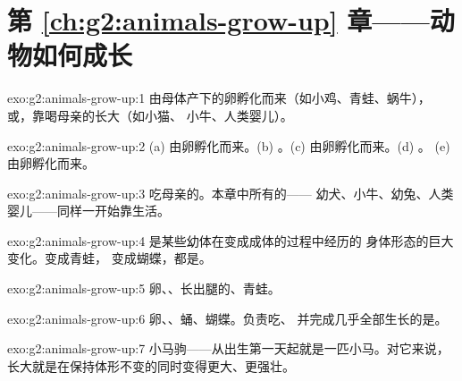 \section*{第 \ref{ch:g2:animals-grow-up} 章——动物如何成长}

\begin{solution}{exo:g2:animals-grow-up:1}
由母体产下的卵孵化而来（如小鸡、青蛙、蜗牛），
或，靠喝母亲的长大（如小猫、
小牛、人类婴儿）。
\end{solution}

\begin{solution}{exo:g2:animals-grow-up:2}
(a) 由卵孵化而来。(b) 。(c) 由卵孵化而来。(d) 。
(e) 由卵孵化而来。
\end{solution}

\begin{solution}{exo:g2:animals-grow-up:3}
吃母亲的。本章中所有的——
幼犬、小牛、幼兔、人类婴儿——同样一开始靠生活。
\end{solution}

\begin{solution}{exo:g2:animals-grow-up:4}
是某些幼体在变成成体的过程中经历的
身体形态的巨大变化。变成青蛙，
变成蝴蝶，都是。
\end{solution}

\begin{solution}{exo:g2:animals-grow-up:5}
卵、、长出腿的、青蛙。
\end{solution}

\begin{solution}{exo:g2:animals-grow-up:6}
卵、、蛹、蝴蝶。负责吃、
并完成几乎全部生长的是。
\end{solution}

\begin{solution}{exo:g2:animals-grow-up:7}
小马驹——从出生第一天起就是一匹小马。对它来说，
长大就是在保持体形不变的同时变得更大、更强壮。
\end{solution}

